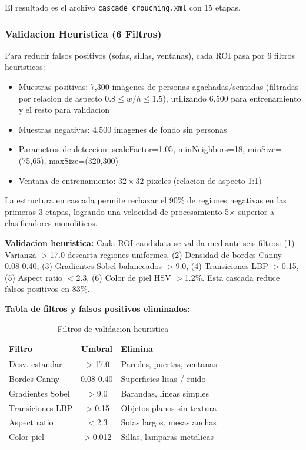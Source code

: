 \documentclass[conference]{IEEEtran}
\begin{document}
El resultado es el archivo \texttt{cascade\_crouching.xml} con 15 etapas.

\subsubsection{Validacion Heuristica (6 Filtros)}

Para reducir falsos positivos (sofas, sillas, ventanas), cada ROI pasa por 6 filtros heuristicos:

\begin{itemize}
    \item Muestras positivas: 7,300 imagenes de personas agachadas/sentadas (filtradas por relacion de aspecto $0.8 \leq w/h \leq 1.5$), utilizando 6,500 para entrenamiento y el resto para validacion
    \item Muestras negativas: 4,500 imagenes de fondo sin personas
    \item Parametros de deteccion: scaleFactor=1.05, minNeighbors=18, minSize=(75,65), maxSize=(320,300)
    \item Ventana de entrenamiento: $32 \times 32$ pixeles (relacion de aspecto 1:1)
\end{itemize}

La estructura en cascada permite rechazar el 90\% de regiones negativas en las primeras 3 etapas, logrando una velocidad de procesamiento 5× superior a clasificadores monoliticos.



\textbf{Validacion heuristica:} Cada ROI candidata se valida mediante seis filtros: (1) Varianza $>$17.0 descarta regiones uniformes, (2) Densidad de bordes Canny 0.08-0.40, (3) Gradientes Sobel balanceados $>$9.0, (4) Transiciones LBP $>$0.15, (5) Aspect ratio $<$2.3, (6) Color de piel HSV $>$1.2\%. Esta cascada reduce falsos positivos en 83\%.

\textbf{Tabla de filtros y falsos positivos eliminados:}

\begin{table}[htbp]
\caption{Filtros de validacion heuristica}
\begin{center}
\begin{tabular}{|l|c|l|}
\hline
\textbf{Filtro} & \textbf{Umbral} & \textbf{Elimina} \\
\hline
Desv. estandar & $>$17.0 & Paredes, puertas, ventanas \\
Bordes Canny & 0.08-0.40 & Superficies lisas / ruido \\
Gradientes Sobel & $>$9.0 & Barandas, lineas simples \\
Transiciones LBP & $>$0.15 & Objetos planos sin textura \\
Aspect ratio & $<$2.3 & Sofas largos, mesas anchas \\
Color piel & $>$0.012 & Sillas, lamparas metalicas \\
\hline
\end{tabular}
\end{center}
\end{table}
\end{document}
